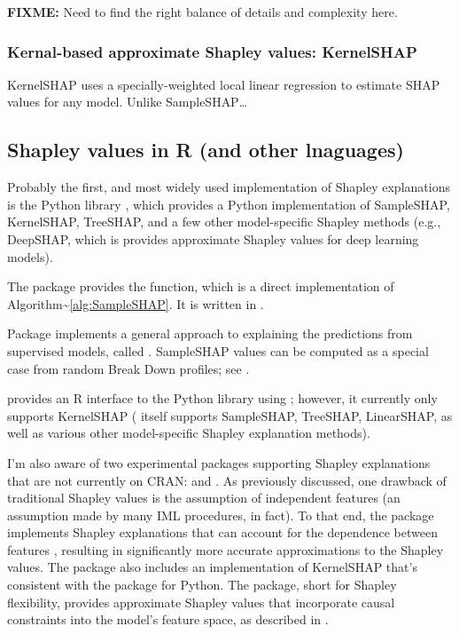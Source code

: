 \textbf{FIXME:} Need to find the right balance of details and complexity
here.

\hypertarget{kernal-based-approximate-shapley-values-kernelshap}{%
\subsubsection{Kernal-based approximate Shapley values:
KernelSHAP}\label{kernal-based-approximate-shapley-values-kernelshap}}

KernelSHAP \citep{lundberg-2017-KernelSHAP} uses a specially-weighted
local linear regression to estimate SHAP values for any model. Unlike
SampleSHAP\ldots{}

\hypertarget{shapley-values-in-r-and-other-lnaguages}{%
\subsection{Shapley values in R (and other
lnaguages)}\label{shapley-values-in-r-and-other-lnaguages}}

Probably the first, and most widely used implementation of Shapley
explanations is the Python  library
\citep{lundberg-2017-KernelSHAP}, which provides a Python implementation
of SampleSHAP, KernelSHAP, TreeSHAP, and a few other model-specific
Shapley methods (e.g., DeepSHAP, which is provides approximate Shapley
values for deep learning models).

The  package \citep{R-iml} provides the 
function, which is a direct implementation of
Algorithm\textasciitilde{}\ref{alg:SampleSHAP}. It is written in
 \citep{R-R6}.

Package  implements a general approach to explaining
the predictions from supervised models, called 
\citep{gosiewska-2019-iBreakDown}. SampleSHAP values can be computed as
a special case from random Break Down profiles; see
.

 provides an R interface to the Python 
library using  \citep{R-reticulate}; however, it
currently only supports KernelSHAP ( itself supports
SampleSHAP, TreeSHAP, LinearSHAP, as well as various other
model-specific Shapley explanation methods).

I'm also aware of two experimental packages supporting Shapley
explanations that are not currently on CRAN: 
\citep{R-sellereite} and  \citep{R-shapFlex}. As
previously discussed, one drawback of traditional Shapley values is the
assumption of independent features (an assumption made by many IML
procedures, in fact). To that end, the  package implements
Shapley explanations that can account for the dependence between
features \citep{aas-2019-explaining}, resulting in significantly more
accurate approximations to the Shapley values. The package also includes
an implementation of KernelSHAP that's consistent with the 
package for Python. The  package, short for Shapley
flexibility, provides approximate Shapley values that incorporate causal
constraints into the model's feature space, as described in
\citet{frye-2019-asymmetric}.

